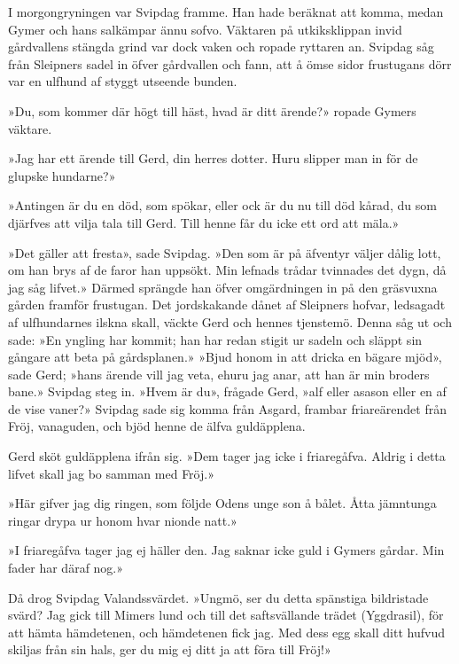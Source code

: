I morgongryningen var Svipdag framme. Han hade beräknat att komma, medan
Gymer och hans salkämpar ännu sofvo. Väktaren på utkiksklippan invid
gårdvallens stängda grind var dock vaken och ropade ryttaren an. Svipdag
såg från Sleipners sadel in öfver gårdvallen och fann, att å ömse sidor
frustugans dörr var en ulfhund af styggt utseende bunden.

»Du, som kommer där högt till häst, hvad är ditt ärende?» ropade Gymers
väktare.

»Jag har ett ärende till Gerd, din herres dotter. Huru slipper man in
för de glupske hundarne?»

»Antingen är du en död, som spökar, eller ock är du nu till död kårad,
du som djärfves att vilja tala till Gerd. Till henne får du icke ett ord
att mäla.»

»Det gäller att fresta», sade Svipdag. »Den som är på äfventyr väljer
dålig lott, om han brys af de faror han uppsökt. Min lefnads trådar
tvinnades det dygn, då jag såg lifvet.» Därmed sprängde han öfver
omgärdningen in på den gräsvuxna gården framför frustugan. Det
jordskakande dånet af Sleipners hofvar, ledsagadt af ulfhundarnes ilskna
skall, väckte Gerd och hennes tjenstemö. Denna såg ut och sade: »En
yngling har kommit; han har redan stigit ur sadeln och släppt sin
gångare att beta på gårdsplanen.» »Bjud honom in att dricka en bägare
mjöd», sade Gerd; »hans ärende vill jag
\protect\hypertarget{lb1625905.xhtmlux5cux23start134}{}{}\protect\hypertarget{lb1625905.xhtmlux5cux23start134-a}{}{}\protect\hypertarget{lb1625905.xhtmlux5cux23start134-b}{}{}\protect\hypertarget{lb1625905.xhtmlux5cux23start134-c}{}{}\protect\hypertarget{lb1625905.xhtmlux5cux23start134-d}{}{}
veta, ehuru jag anar, att han är min broders bane.» Svipdag steg in.
»Hvem är du», frågade Gerd, »alf eller asason eller en af de vise
vaner?» Svipdag sade sig komma från Asgard, frambar friareärendet från
Fröj, vanaguden, och bjöd henne de älfva guldäpplena.

Gerd sköt guldäpplena ifrån sig. »Dem tager jag icke i friaregåfva.
Aldrig i detta lifvet skall jag bo samman med Fröj.»

»Här gifver jag dig ringen, som följde Odens unge son å bålet. Åtta
jämntunga ringar drypa ur honom hvar nionde natt.»

»I friaregåfva tager jag ej häller den. Jag saknar icke guld i Gymers
gårdar. Min fader har däraf nog.»

Då drog Svipdag Valandssvärdet. »Ungmö, ser du detta spänstiga
bildristade svärd? Jag gick till Mimers lund och till det saftsvällande
trädet (Yggdrasil), för att hämta hämdetenen, och hämdetenen fick jag.
Med dess egg skall ditt hufvud skiljas från sin hals, ger du mig ej ditt
ja att föra till Fröj!»

